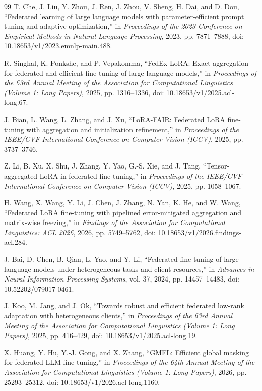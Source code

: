 \documentclass[10pt,conference,letterpaper]{IEEEtran}
\begin{document}
\begin{thebibliography}{99}
T. Che, J. Liu, Y. Zhou, J. Ren, J. Zhou, V. Sheng, H. Dai, and D. Dou,
``Federated learning of large language models with parameter-efficient prompt tuning and adaptive optimization,''
in \emph{Proceedings of the 2023 Conference on Empirical Methods in Natural Language Processing}, 2023, pp. 7871--7888,
doi: 10.18653/v1/2023.emnlp-main.488.

R. Singhal, K. Ponkshe, and P. Vepakomma,
``FedEx-LoRA: Exact aggregation for federated and efficient fine-tuning of large language models,''
in \emph{Proceedings of the 63rd Annual Meeting of the Association for Computational Linguistics (Volume 1: Long Papers)}, 2025, pp. 1316--1336,
doi: 10.18653/v1/2025.acl-long.67.

J. Bian, L. Wang, L. Zhang, and J. Xu,
``LoRA-FAIR: Federated LoRA fine-tuning with aggregation and initialization refinement,''
in \emph{Proceedings of the IEEE/CVF International Conference on Computer Vision (ICCV)}, 2025, pp. 3737--3746.

Z. Li, B. Xu, X. Shu, J. Zhang, Y. Yao, G.-S. Xie, and J. Tang,
``Tensor-aggregated LoRA in federated fine-tuning,''
in \emph{Proceedings of the IEEE/CVF International Conference on Computer Vision (ICCV)}, 2025, pp. 1058--1067.

H. Wang, X. Wang, Y. Li, J. Chen, J. Zhang, N. Yan, K. He, and W. Wang,
``Federated LoRA fine-tuning with pipelined error-mitigated aggregation and matrix-wise freezing,''
in \emph{Findings of the Association for Computational Linguistics: ACL 2026}, 2026, pp. 5749--5762,
doi: 10.18653/v1/2026.findings-acl.284.

J. Bai, D. Chen, B. Qian, L. Yao, and Y. Li,
``Federated fine-tuning of large language models under heterogeneous tasks and client resources,''
in \emph{Advances in Neural Information Processing Systems}, vol. 37, 2024, pp. 14457--14483,
doi: 10.52202/079017-0461.

J. Koo, M. Jang, and J. Ok,
``Towards robust and efficient federated low-rank adaptation with heterogeneous clients,''
in \emph{Proceedings of the 63rd Annual Meeting of the Association for Computational Linguistics (Volume 1: Long Papers)}, 2025, pp. 416--429,
doi: 10.18653/v1/2025.acl-long.19.

X. Huang, Y. Hu, Y.-J. Gong, and X. Zhang,
``GMFL: Efficient global masking for federated LLM fine-tuning,''
in \emph{Proceedings of the 64th Annual Meeting of the Association for Computational Linguistics (Volume 1: Long Papers)}, 2026, pp. 25293--25312,
doi: 10.18653/v1/2026.acl-long.1160.


\end{thebibliography}
\end{document}
